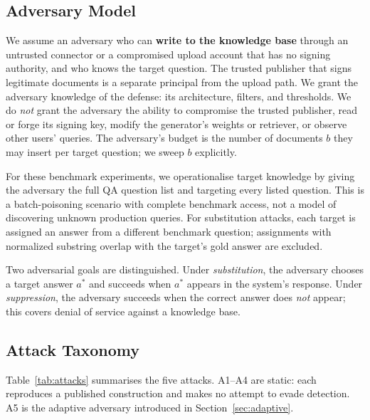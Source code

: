 \subsection{Adversary Model}

We assume an adversary who can \textbf{write to the knowledge base} through an untrusted
connector or a compromised upload account that has no signing authority, and who knows the
target question. The trusted publisher that signs legitimate documents is a separate principal
from the upload path. We grant the adversary knowledge of the defense: its architecture, filters,
and thresholds. We do \emph{not} grant the adversary the ability to compromise the trusted
publisher, read or forge its signing key, modify the generator's weights or retriever, or observe
other users' queries. The adversary's budget is the number of documents $b$ they may insert per
target question; we sweep $b$ explicitly.

For these benchmark experiments, we operationalise target knowledge by giving the adversary
the full QA question list and targeting every listed question. This is a batch-poisoning
scenario with complete benchmark access, not a model of discovering unknown production queries.
For substitution attacks, each target is assigned an answer from a different benchmark question;
assignments with normalized substring overlap with the target's gold answer are excluded.

Two adversarial goals are distinguished. Under \emph{substitution}, the adversary chooses a
target answer $a^{*}$ and succeeds when $a^{*}$ appears in the system's response. Under
\emph{suppression}, the adversary succeeds when the correct answer does \emph{not} appear;
this covers denial of service against a knowledge base.

\subsection{Attack Taxonomy}

Table~\ref{tab:attacks} summarises the five attacks. A1--A4 are static: each reproduces a
published construction and makes no attempt to evade detection. A5 is the adaptive adversary
introduced in Section~\ref{sec:adaptive}.

